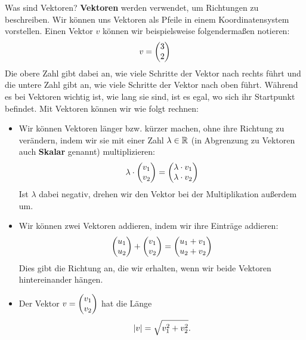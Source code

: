 \documentclass[../../main.tex]{subfiles}
\begin{document}
\fi
\begin{nutshell}{Was sind Vektoren?}
    \textbf{Vektoren} werden verwendet, um Richtungen zu beschreiben. Wir können uns Vektoren als Pfeile in einem 
    Koordinatensystem vorstellen. Einen Vektor $v$ können wir beispielsweise folgendermaßen notieren:
    \[v=\begin{pmatrix} 3\\ 2 \end{pmatrix}\]
    Die obere Zahl gibt dabei an, wie viele Schritte der Vektor nach rechts führt und die untere Zahl gibt an, wie viele
    Schritte der Vektor nach oben führt. Während es bei Vektoren wichtig ist, wie lang sie sind, ist es egal, wo sich
    ihr Startpunkt befindet. Mit Vektoren können wir wie folgt rechnen:

    \vspace*{3mm}
    \begin{minipage}{5cm}
        \end{minipage}
    \begin{itemize}
        \item Wir können Vektoren länger bzw. kürzer machen, ohne ihre Richtung zu verändern, indem wir sie mit einer Zahl $\lambda\in\mathbb{R}$ (in
        Abgrenzung zu Vektoren auch \textbf{Skalar} genannt) multiplizieren:
        \[\lambda\cdot \begin{pmatrix} v_1\\ v_2 \end{pmatrix}=\begin{pmatrix} \lambda\cdot v_1\\ \lambda \cdot v_2 \end{pmatrix}\]
        Ist $\lambda$ dabei negativ, drehen wir den Vektor bei der Multiplikation außerdem um.
        \item Wir können zwei Vektoren addieren, indem wir ihre Einträge addieren:
        \[\begin{pmatrix} u_1\\ u_2 \end{pmatrix}+\begin{pmatrix} v_1\\ v_2 \end{pmatrix}=\begin{pmatrix} u_1+v_1\\ u_2+v_2 \end{pmatrix}\]
        Dies gibt die Richtung an, die wir erhalten, wenn wir beide Vektoren hintereinander hängen.
        \item Der Vektor $v=\begin{pmatrix} v_1\\ v_2 \end{pmatrix}$ hat die Länge
        \[\lvert v\rvert=\sqrt{v_1^2+v_2^2}.\]
    \end{itemize}
\end{nutshell}
\end{document}
